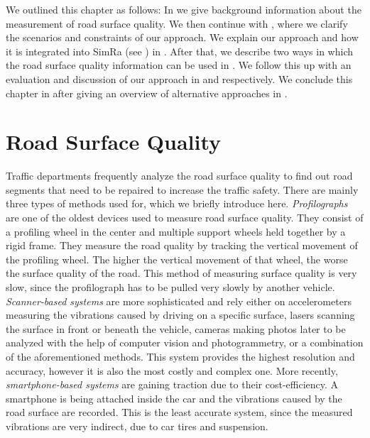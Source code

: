 We outlined this chapter as follows:
In  we give background information about the measurement of road surface quality.
We then continue with , where we clarify the scenarios and constraints of our approach.
We explain our approach and how it is integrated into SimRa (see ) in .
After that, we describe two ways in which the road surface quality information can be used in .
We follow this up with an evaluation and discussion of our approach in  and  respectively.
We conclude this chapter in  after giving an overview of alternative approaches in .

\section{Road Surface Quality}
\label{sec:surface_quality_background}
Traffic departments frequently analyze the road surface quality to find out road segments that need to be repaired to increase the traffic safety.
There are mainly three types of methods used for, which we briefly introduce here.
\textit{Profilographs} are one of the oldest devices used to measure road surface quality.
They consist of a profiling wheel in the center and multiple support wheels held together by a rigid frame.
They measure the road quality by tracking the vertical movement of the profiling wheel.
The higher the vertical movement of that wheel, the worse the surface quality of the road.
This method of measuring surface quality is very slow, since the profilograph has to be pulled very slowly by another vehicle.
\textit{Scanner-based systems} are more sophisticated and rely either on accelerometers measuring the vibrations caused by driving on a specific surface, lasers scanning the surface in front or beneath the vehicle, cameras making photos later to be analyzed with the help of computer vision and photogrammetry, or a combination of the aforementioned methods.
This system provides the highest resolution and accuracy, however it is also the most costly and complex one.
More recently, \textit{smartphone-based systems} are gaining traction due to their cost-efficiency.
A smartphone is being attached inside the car and the vibrations caused by the road surface are recorded.
This is the least accurate system, since the measured vibrations are very indirect, due to car tires and suspension.

